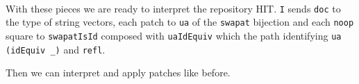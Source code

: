 \begin{code}
\AgdaOperator{\AgdaFunction{[}}\AgdaSpace{}%
\AgdaSpace{}%
\AgdaOperator{\AgdaFunction{]\%=}}\AgdaSpace{}%
\AgdaSpace{}%
\AgdaSymbol{)}\AgdaSpace{}%
\AgdaSpace{}%
\<%
\\
\>[16][@{}l@{\AgdaIndent{0}}]%
\>[18]\AgdaSpace{}%
\AgdaOperator{\AgdaFunction{[}}\AgdaSpace{}%
\AgdaSpace{}%
\AgdaOperator{\AgdaFunction{]\%=}}\AgdaSpace{}%
\<%
\\
%
\>[16]\AgdaSpace{}%
\AgdaSpace{}%
\<%
\\
\>[16][@{}l@{\AgdaIndent{0}}]%
\>[18]\AgdaSpace{}%
\AgdaSpace{}%
\<%
\\
%
\\[\AgdaEmptyExtraSkip]%
\>[0]\AgdaSpace{}%
\AgdaSymbol{:}\AgdaSpace{}%
\AgdaSymbol{\{}\AgdaSpace{}%
\AgdaSymbol{:}\AgdaSpace{}%
\AgdaSymbol{\}}\AgdaSpace{}%
\AgdaSymbol{\{}\AgdaSpace{}%
\AgdaSymbol{:}\AgdaSpace{}%
\AgdaSpace{}%
\AgdaSymbol{\}}\AgdaSpace{}%
\AgdaSpace{}%
\AgdaSpace{}%
\AgdaSymbol{(}\AgdaSpace{}%
\AgdaOperator{\AgdaInductiveConstructor{,}}\AgdaSpace{}%
\AgdaSymbol{)}\AgdaSpace{}%
\AgdaSpace{}%
\AgdaSpace{}%
\AgdaSpace{}%
\<%
\\
\>[0]\AgdaSpace{}%
\AgdaSymbol{=}\AgdaSpace{}%
\AgdaSpace{}%
\<%
\end{code}

With these pieces we are ready to interpret the repository HIT.
\texttt{I} sends \texttt{doc} to the type of string vectors, each patch to \texttt{ua} of the
\texttt{swapat} bijection and each \texttt{noop} square to \texttt{swapatIsId} composed with
\texttt{uaIdEquiv} which the path identifying \texttt{ua (idEquiv \_)} and \texttt{refl}.

Then we can interpret and apply patches like before.

